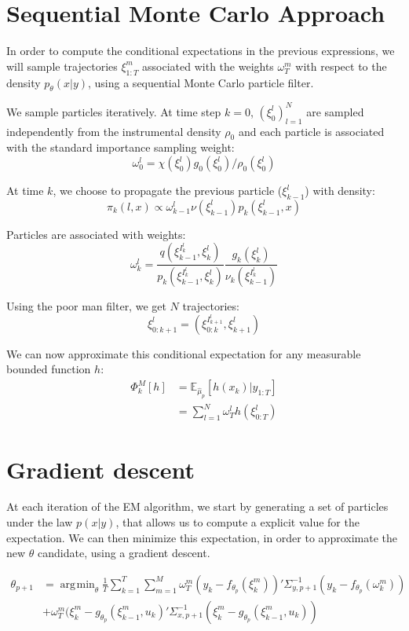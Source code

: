 \documentclass[10pt,a4paper]{report}
\DeclareMathOperator*{\argmin}{\arg\!\min}
\begin{document}
\section{Sequential Monte Carlo Approach}
In order to compute the conditional expectations in the previous expressions, we will sample trajectories $\xi_{1:T}^m$ associated with the weights $\omega_T^m$ with respect to the density $p_{\theta}(x | y)$, using a sequential Monte Carlo particle filter.

We sample particles iteratively. At time step $k=0$, $(\xi_0^l)_{l=1}^N$ are sampled independently from the instrumental density $\rho_0$ and each particle is associated with the standard importance sampling weight:
$$\omega_0^l=\chi(\xi_0^l) g_0(\xi_0^l) / \rho_0(\xi_0^l)$$

At time $k$, we choose to propagate the previous particle ($\xi_{k-1}^l$) with density:
$$\pi_k(l, x) \propto \omega_{k-1}^l \nu(\xi_{k-1}^l) p_k(\xi_{k-1}^l, x) $$

Particles are associated with weights:
$$\omega_k^l = \frac{q(\xi_{k-1}^{I_k^l}, \xi_k^l)}{p_k(\xi_{k-1}^{I_k^l}, \xi_k^l)} \frac{g_k(\xi_k^l)}{\nu_k(\xi_{k-1}^{I_k^l})}$$

Using the poor man filter, we get $N$ trajectories:
$$\xi_{0:k+1}^{l} = (\xi_{0:k}^{I_{k+1}^l}, \xi_{k+1}^l)$$

We can now approximate this conditional expectation for any measurable bounded function $h$:
\begin{align*}
    \Phi_k^M[h] & = \mathbb{E}_{\hat \mu_p} \left[ h(x_k) | y_{1:T} \right] \\
                & = \sum_{l=1}^N \omega_T^l h(\xi_{0:T}^l)
\end{align*}

\section{Gradient descent}
At each iteration of the EM algorithm, we start by generating a set of particles under the law $p(x|y)$, that allows us to compute a explicit value for the expectation. We can then minimize this expectation, in order to approximate the new $\theta$ candidate, using a gradient descent.

\begin{align*}
    \theta_{p+1} & = \argmin_{\theta} \frac{1}{T}\sum_{k=1}^T \sum_{m=1}^M \omega_T^m (y_k - f_{\theta_p}(\xi_k^m))' \Sigma_{y, p+1}^{-1} (y_k - f_{\theta_p}(\omega_k^m)) \\
                 & + \omega_T^m (\xi_k^m - g_{\theta_p}(\xi_{k-1}^m, u_k)'\Sigma_{x, p+1}^{-1}(\xi_k^m - g_{\theta_p}(\xi_{k-1}^m, u_k))
\end{align*}
\end{document}
